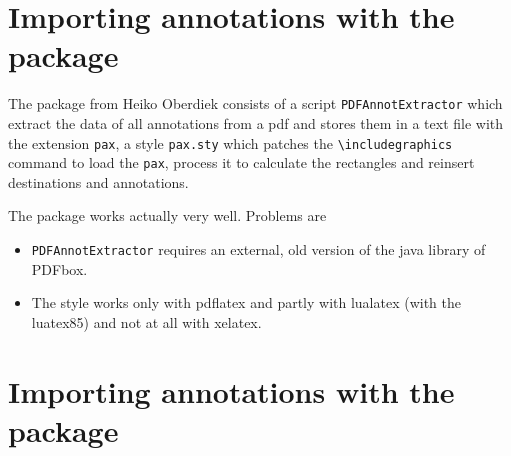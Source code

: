 \documentclass[DIV=12,parskip=half-,bibliography=totoc]{scrartcl}
\begin{document}
\section{Importing annotations with the  package}

The  package from Heiko Oberdiek consists of a script \texttt{PDFAnnotExtractor}
which extract the data of all annotations from a pdf and stores them in a text file with the extension \texttt{pax}, a style \texttt{pax.sty} which patches the \verb+\includegraphics+ command to load the \texttt{pax}, process it to calculate the rectangles and reinsert destinations and annotations.

The package works actually very well. Problems are
\begin{itemize}
\item \texttt{PDFAnnotExtractor} requires an external, old version of the java library of PDFbox.
\item The style works only with pdflatex and partly with lualatex (with the luatex85) and not at all with xelatex. 
\end{itemize}

\section{Importing annotations with the  package}
\end{document}
